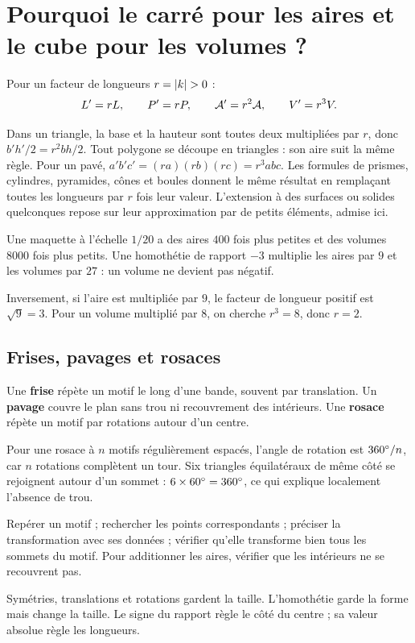\documentclass[../cours_3e.tex]{subfiles}
\begin{document}
\section{Pourquoi le carré pour les aires et le cube pour les volumes ?}
\begin{propriete}
Pour un facteur de longueurs $r=\abs k>0$ :
\[L'=rL,\qquad P'=rP,\qquad \mathcal{A}'=r^2\mathcal{A},\qquad V'=r^3V.\]
\end{propriete}
\begin{demonstration}
Dans un triangle, la base et la hauteur sont toutes deux multipliées par $r$, donc $b'h'/2=r^2bh/2$. Tout polygone se découpe en triangles : son aire suit la même règle. Pour un pavé, $a'b'c'=(ra)(rb)(rc)=r^3abc$. Les formules de prismes, cylindres, pyramides, cônes et boules donnent le même résultat en remplaçant toutes les longueurs par $r$ fois leur valeur. L'extension à des surfaces ou solides quelconques repose sur leur approximation par de petits éléments, admise ici.
\end{demonstration}
\begin{exemple}
Une maquette à l'échelle $1/20$ a des aires $400$ fois plus petites et des volumes $8000$ fois plus petits. Une homothétie de rapport $-3$ multiplie les aires par $9$ et les volumes par $27$ : un volume ne devient pas négatif.
\end{exemple}
Inversement, si l'aire est multipliée par $9$, le facteur de longueur positif est $\sqrt9=3$. Pour un volume multiplié par $8$, on cherche $r^3=8$, donc $r=2$.
\begin{finchapitre}
\section{Frises, pavages et rosaces}
Une \textbf{frise} répète un motif le long d'une bande, souvent par translation. Un \textbf{pavage} couvre le plan sans trou ni recouvrement des intérieurs. Une \textbf{rosace} répète un motif par rotations autour d'un centre.

Pour une rosace à $n$ motifs régulièrement espacés, l'angle de rotation est $360^{\circ}/n$, car $n$ rotations complètent un tour. Six triangles équilatéraux de même côté se rejoignent autour d'un sommet : $6\times60^{\circ}=360^{\circ}$, ce qui explique localement l'absence de trou.
\begin{methode}
Repérer un motif ; rechercher les points correspondants ; préciser la transformation avec ses données ; vérifier qu'elle transforme bien tous les sommets du motif. Pour additionner les aires, vérifier que les intérieurs ne se recouvrent pas.
\end{methode}
\begin{retenir}
Symétries, translations et rotations gardent la taille. L'homothétie garde la forme mais change la taille. Le signe du rapport règle le côté du centre ; sa valeur absolue règle les longueurs.
\end{retenir}
\end{finchapitre}
\end{document}
